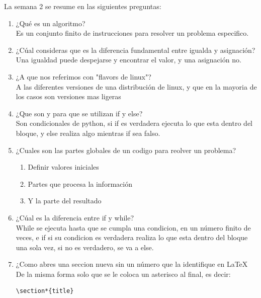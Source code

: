 \documentclass[letterpaper, 12pt, oneside]{article}%
\begin{document}
La semana 2 se resume en las siguientes preguntas:%
\begin{enumerate}%
	\item ¿Qué es un algoritmo? \\
	 Es un conjunto finito de instrucciones para resolver
	 un problema especifico.
	
	\item ¿Cúal consideras que es la diferencia fundamental entre igualda y asignación?\\
	Una igualdad puede despejarse y encontrar el valor, y una asignación no.
	\item ¿A que nos referimos con "flavors de linux"?\\
	A las diferentes versiones de una distribución de linux, y que en la mayoria de los casos son versiones mas ligeras
	
	\item ¿Que son y para que se utilizan if y else?\\
	Son condicionales de python, si if es verdadera ejecuta lo que esta dentro del bloque, y else realiza algo mientras if sea falso.
	\item ¿Cuales son las partes globales de un codigo para reolver un problema?
		\begin{enumerate}
			\item Definir valores iniciales
			\item Partes que procesa la información
			\item Y la parte del resultado
		\end{enumerate}
	
	\item ¿Cúal es la diferencia entre if y while?\\
	While se ejecuta hasta que se cumpla una condicion, en un número finito de veces, e if si su condicion es verdadera realiza lo que esta dentro del bloque una sola vez, si no es verdadero, se va a else.
	
	\item ¿Como abres una seccion nueva sin un número que la identifique en \LaTeX\\
	De la misma forma solo que se le coloca un asterisco al final, es decir: \begin{lstlisting}
\section*{title}
	\end{lstlisting}
	

\end{enumerate}
\end{document}
